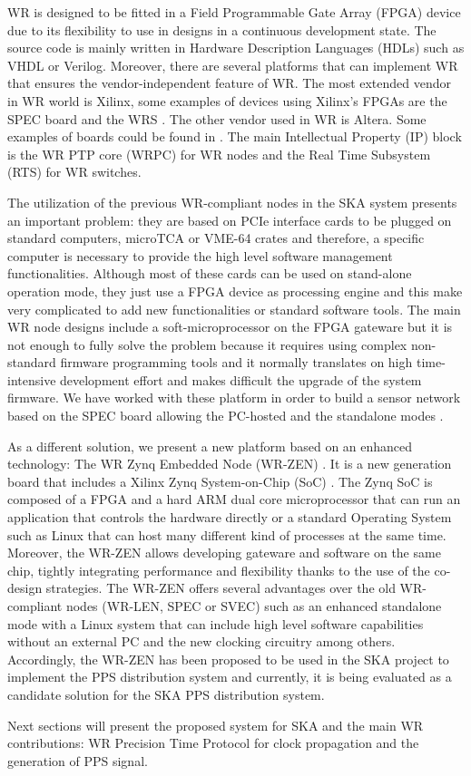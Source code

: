 WR is designed to be fitted in a Field Programmable Gate Array (FPGA) device due to its flexibility to use in designs in a continuous development state. The source code is mainly written in Hardware Description Languages (HDLs) such as VHDL or Verilog. Moreover, there are several platforms that can implement WR that ensures the vendor-independent feature of WR. The most extended vendor in WR world is Xilinx, some examples of devices using Xilinx's FPGAs are the SPEC board \cite{ohwr:spec} and the WRS \cite{ohwr:wrs}. The other vendor used in WR is Altera. Some examples of boards could be found in \cite{cesar-altera-wr}. The main Intellectual Property (IP) block is the WR PTP core (WRPC) for WR nodes and the Real Time Subsystem (RTS) for WR switches. 

The utilization of the previous WR-compliant nodes in the SKA system presents an important problem: they are based on PCIe interface cards to be plugged on standard computers, microTCA or VME-64 crates and therefore, a specific computer is necessary to provide the high 
level software management functionalities. Although most of these cards can be used on stand-alone operation mode, they just use a FPGA device as processing engine and this make very complicated to add new functionalities or standard software tools. The main WR node designs include a soft-microprocessor on the FPGA gateware but it is not 
enough to fully solve the problem because it requires using complex 
non-standard firmware programming tools and it normally translates on high time-intensive development effort and makes difficult the upgrade of the system firmware. We have worked with these platform in order to build a sensor network based on the SPEC board allowing the PC-hosted and the standalone modes \cite{migueljl-paper-wr-spec}.

As a different solution, we present a new platform based on an enhanced technology: The WR Zynq Embedded Node (WR-ZEN) \cite{sevensols:wr_zen}. It is a new generation board that includes a Xilinx Zynq System-on-Chip (SoC) \cite{xilinx:zynq}. The Zynq SoC is composed of a FPGA and a hard ARM dual core microprocessor that can run an application that controls the hardware directly or a standard Operating System such as Linux that can host many different kind of processes at the same time. Moreover, the WR-ZEN allows developing gateware and software on the same chip, tightly integrating performance and flexibility thanks to the use of the co-design strategies. The WR-ZEN offers several advantages over the old WR-compliant nodes (WR-LEN, SPEC or SVEC) such as an enhanced standalone mode with a Linux system that can include high level software capabilities without an external PC and the new clocking circuitry among others. Accordingly, the WR-ZEN has been proposed to be used in the SKA project to implement the PPS distribution system and currently, it is being evaluated as a candidate solution for the SKA PPS distribution system.  

Next sections will present the proposed system for SKA and the main WR contributions: WR Precision Time Protocol for clock propagation and the generation of PPS signal. 
